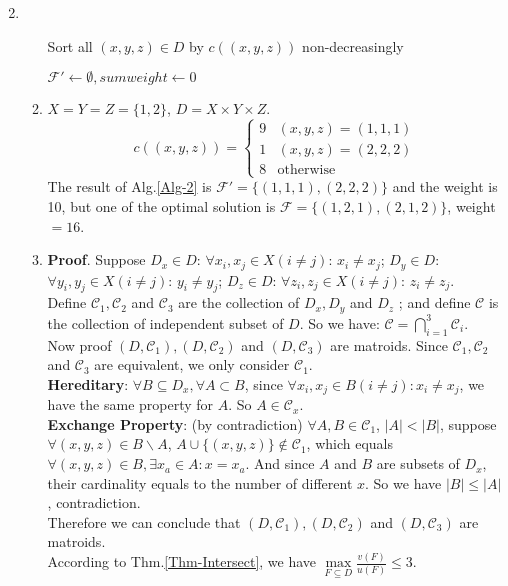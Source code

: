 \documentclass[12pt,a4paper]{article}
\makeatletter
\newtheorem*{solution}{Solution}
\theoremstyle{definition}
\renewenvironment{solution}[1][Solution] {\par\pushQED{\qed}\normalfont\topsep6\p@\@plus6\p@\relax\trivlist\item[\hskip\labelsep\bfseries#1\@addpunct{.}]\ignorespaces}{\popQED\endtrivlist\@endpefalse} \makeatother
\makeatother
\begin{document}
\begin{enumerate}
\begin{solution}
\begin{enumerate}
\begin{minipage}[t]{0.89\textwidth}
\begin{algorithm}[H]
					Sort all $ (x,y,z) \in D$ by $ c((x,y,z)) $ non-decreasingly\;
					
					$ \mathcal{F'} \leftarrow \emptyset ,sumweight\leftarrow0$\;
					
					
					\;
					
				\end{algorithm}
			\end{minipage}
			\item $ X = Y = Z = \{1,2\} $, $ D = X\times Y\times Z $.
			$$c((x,y,z))=
			\begin{cases}
			9 &(x,y,z) = (1,1,1)\\
			1 &(x,y,z) = (2,2,2)\\
			8 &\text{otherwise}
			\end{cases}
			$$
			The result of Alg.\ref{Alg-2} is $ \mathcal{F'}=\{(1,1,1),(2,2,2)\} $ and the weight is 10, but one of the optimal solution is $ \mathcal{F}=\{(1,2,1),(2,1,2)\} $, weight$ = 16 $.
			\item
			\textbf{Proof}. Suppose $ D_x\in D $: $ \forall x_i,x_j\in X (i\neq j)$: $ x_i\neq x_j  $; \quad$ D_y\in D $: $ \forall y_i,y_j\in X (i\neq j)$: $ y_i\neq y_j$; \quad $ D_z\in D $: $ \forall z_i,z_j\in X (i\neq j)$: $ z_i\neq z_j$. \\ 
			Define $ \mathcal{C}_1,\mathcal{C}_2 $ and $ \mathcal{C}_3 $ are the collection of $ D_x,D_y $ and $ D_z $ ; and define $ \mathcal{C} $ is the collection of independent subset of $ D $. So we have: $ \mathcal{C}=\bigcap_{i=1}^{3} \mathcal{C}_{i} $.\\
			Now proof $ (D,\mathcal{C}_1),(D,\mathcal{C}_2) $ and $ (D,\mathcal{C}_3) $ are matroids. Since $ \mathcal{C}_1,\mathcal{C}_2 $ and $ \mathcal{C}_3 $ are equivalent, we only consider $ \mathcal{C}_1 $.\\
			\textbf{Hereditary}: $ \forall B\subseteq D_x, \forall A \subset B$, since $ \forall x_i,x_j\in B(i\neq j): x_i\neq x_j $, we have the same property for $ A $. So $ A\in\mathcal{C}_x $.\\
			\textbf{Exchange Property}: (by contradiction) $\forall A,B\in \mathcal{C}_1$, $ |A|<|B| $, suppose $ \forall (x,y,z)\in B\backslash A$, $ A\cup \{(x,y,z)\}\notin \mathcal{C}_1$, which equals $ \forall (x,y,z)\in B,\exists x_a \in A: x = x_a $. And since $ A $ and $ B $ are subsets of $ D_x $, their cardinality equals to the number of different $ x $. So we have $ |B|\leq|A| $, contradiction.\\
			Therefore we can conclude that $ (D,\mathcal{C}_1),(D,\mathcal{C}_2) $ and $ (D,\mathcal{C}_3) $ are matroids.\\
			According to Thm.\ref{Thm-Intersect}, we have  $\max\limits_{F \subseteq D} \frac{v(F)}{u(F)} \leq 3$. 
		\end{enumerate}
	\end{solution}



\end{enumerate}
\end{document}
